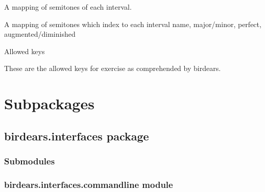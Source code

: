 \documentclass[letterpaper,10pt,english]{sphinxmanual}
\begin{document}

\begin{fulllineitems}
\label{\detokenize{birdears:birdears.INTERVAL_INDEX}}
 \textendash{} A mapping of semitones of each interval.

A mapping of semitones which index to each interval name, major/minor,
perfect, augmented/diminished

\end{fulllineitems}


\begin{fulllineitems}
\label{\detokenize{birdears:birdears.KEYS}}
 \textendash{} Allowed keys

These are the allowed keys for exercise as comprehended by birdears.

\end{fulllineitems}



\section{Subpackages}
\label{\detokenize{birdears:subpackages}}

\subsection{birdears.interfaces package}
\label{\detokenize{birdears.interfaces:birdears-interfaces-package}}\label{\detokenize{birdears.interfaces::doc}}\label{\detokenize{birdears.interfaces:module-birdears.interfaces}}

\subsubsection{Submodules}
\label{\detokenize{birdears.interfaces:submodules}}

\subsubsection{birdears.interfaces.commandline module}
\label{\detokenize{birdears.interfaces:birdears-interfaces-commandline-module}}\label{\detokenize{birdears.interfaces:module-birdears.interfaces.commandline}}
\end{document}

